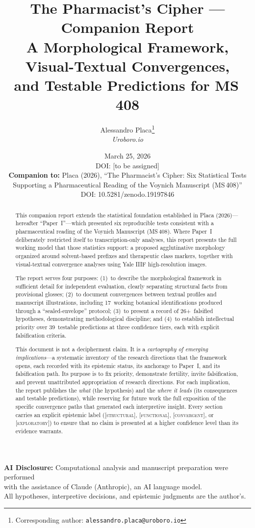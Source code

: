 \documentclass[11pt,a4paper]{article}
\title{\textbf{The Pharmacist's Cipher --- Companion Report}\\[0.5em]
\large A Morphological Framework, Visual-Textual Convergences,\\and Testable Predictions for MS\,408}
\author{Alessandro Placa\thanks{Corresponding author: \texttt{alessandro.placa@uroboro.io}}\\\textit{Uroboro.io}}
\date{March 25, 2026\\[0.3em]
\small DOI: [to be assigned]\\[0.5em]
\small\textbf{Companion to:} Placa (2026), ``The Pharmacist's Cipher: Six Statistical Tests\\Supporting a Pharmaceutical Reading of the Voynich Manuscript (MS\,408)''\\DOI: 10.5281/zenodo.19197846}
\newcommand{\structural}{\textsc{[structural]}}
\newcommand{\functional}{\textsc{[functional]}}
\newcommand{\convergent}{\textsc{[convergent]}}
\newcommand{\exploratory}{\textsc{[exploratory]}}
\begin{document}
\maketitle

\begin{center}
\small
\textbf{AI Disclosure:} Computational analysis and manuscript preparation were performed\\
with the assistance of Claude (Anthropic), an AI language model.\\
All hypotheses, interpretive decisions, and epistemic judgments are the author's.
\end{center}

\begin{abstract}
This companion report extends the statistical foundation established in Placa (2026)---hereafter ``Paper~I''---which presented six reproducible tests consistent with a pharmaceutical reading of the Voynich Manuscript (MS\,408). Where Paper~I deliberately restricted itself to transcription-only analyses, this report presents the full working model that those statistics support: a proposed agglutinative morphology organized around solvent-based prefixes and therapeutic class markers, together with visual-textual convergence analyses using Yale IIIF high-resolution images.

The report serves four purposes: (1)~to describe the morphological framework in sufficient detail for independent evaluation, clearly separating structural facts from provisional glosses; (2)~to document convergences between textual profiles and manuscript illustrations, including 17~working botanical identifications produced through a ``sealed-envelope'' protocol; (3)~to present a record of 26+~falsified hypotheses, demonstrating methodological discipline; and (4)~to establish intellectual priority over 39~testable predictions at three confidence tiers, each with explicit falsification criteria.

This document is not a decipherment claim. It is a \textit{cartography of emerging implications}---a systematic inventory of the research directions that the framework opens, each recorded with its epistemic status, its anchorage to Paper~I, and its falsification path. Its purpose is to fix priority, demonstrate fertility, invite falsification, and prevent unattributed appropriation of research directions. For each implication, the report publishes the \textit{what} (the hypothesis) and the \textit{where it leads} (its consequences and testable predictions), while reserving for future work the full exposition of the specific convergence paths that generated each interpretive insight. Every section carries an explicit epistemic label (\structural{}, \functional{}, \convergent{}, or \exploratory{}) to ensure that no claim is presented at a higher confidence level than its evidence warrants.
\end{abstract}
\end{document}
